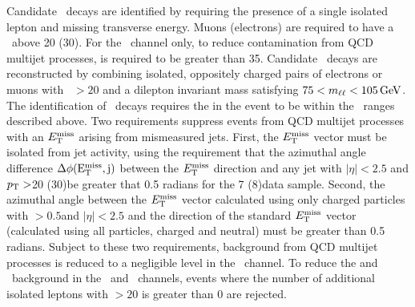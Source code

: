 \documentclass[11pt,twoside,a4paper,cmspaper,final,collab]{cms-tdr}
\begin{document}
Candidate \WtoLN\ decays are identified by requiring
the presence of a single isolated lepton and missing
transverse energy. Muons (electrons) are required to have a \pt\ above
20 (30)\GeV.  %
For the
\WenH\ channel only, to reduce contamination from QCD multijet
processes,
\MET is required to be greater than 35\GeV.
Candidate \ZtoLL\ decays are reconstructed by combining
isolated, oppositely charged pairs of electrons or muons with  \pt\ $> 20$\GeV
and a dilepton invariant
mass satisfying $75<m_{\ell\ell}<105\,\text{Ge\hspace{-.08em}V}$.  The identification of \ZtoNN\ decays
requires the \MET in the event to be within the \ptV\ ranges
described above.
Two requirements suppress events from QCD multijet processes
with an $E_{\mathrm{T}}^{\text{miss}}$ arising from mismeasured jets.
First, the $E_{\mathrm{T}}^{\text{miss}}$ vector must be isolated from jet activity, using
the requirement that the azimuthal angle difference $\Delta\phi(\mathrm{E_{\mathrm{T}}^{\text{miss}},j})$ between
the  $E_{\mathrm{T}}^{\text{miss}}$ direction and any jet with $|\eta|<2.5$ and $p_{\mathrm{T}}>$20
(30)\GeV  be greater that 0.5 radians for the 7 (8)\TeV data sample.
Second, the azimuthal angle between the
$E_{\mathrm{T}}^{\text{miss}}$ vector
calculated using only charged particles with \pt$>0.5$\GeV and $\left |
  \eta \right |<2.5$ and the direction of the standard $E_{\mathrm{T}}^{\text{miss}}$ vector (calculated using all particles, charged
and neutral) must be greater than 0.5 radians.
Subject to these two requirements, background from QCD multijet processes
is reduced to a negligible level in the \ZnnH\ channel.
To reduce the \ttbar and \WZ\ background in the \WH\ and \ZnnH\ channels,
events where the number of additional isolated leptons with \pt$>20$\GeV %
is greater than 0  are rejected.
\end{document}
